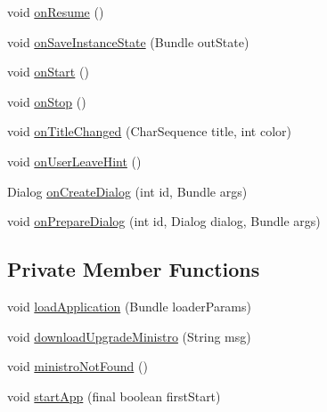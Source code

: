 \begin{DoxyCompactItemize}
\item 
void \hyperlink{classorg_1_1kde_1_1necessitas_1_1origo_1_1_qt_activity_ab896135952040c849fccf0aa795aa860}{on\-Resume} ()
\item 
void \hyperlink{classorg_1_1kde_1_1necessitas_1_1origo_1_1_qt_activity_a37b81ac0502a9d8c15e670a52948463e}{on\-Save\-Instance\-State} (Bundle out\-State)
\item 
void \hyperlink{classorg_1_1kde_1_1necessitas_1_1origo_1_1_qt_activity_aa10945ea75fbdd9568b8b8202057bbec}{on\-Start} ()
\item 
void \hyperlink{classorg_1_1kde_1_1necessitas_1_1origo_1_1_qt_activity_a7055e970211a8bf0637d48ca4632980a}{on\-Stop} ()
\item 
void \hyperlink{classorg_1_1kde_1_1necessitas_1_1origo_1_1_qt_activity_aa40948204cbea803a4e5c18365efc2b7}{on\-Title\-Changed} (Char\-Sequence title, int color)
\item 
void \hyperlink{classorg_1_1kde_1_1necessitas_1_1origo_1_1_qt_activity_a0cac0e48f2322ee42c1cdc195ec69598}{on\-User\-Leave\-Hint} ()
\item 
Dialog \hyperlink{classorg_1_1kde_1_1necessitas_1_1origo_1_1_qt_activity_a8ed2ef09ad8b93d417b9a9f0f6e3f5fb}{on\-Create\-Dialog} (int id, Bundle args)
\item 
void \hyperlink{classorg_1_1kde_1_1necessitas_1_1origo_1_1_qt_activity_aafaafd0dbcb59708982dc119082195ce}{on\-Prepare\-Dialog} (int id, Dialog dialog, Bundle args)
\end{DoxyCompactItemize}
\subsection*{Private Member Functions}
\begin{DoxyCompactItemize}
\item 
void \hyperlink{classorg_1_1kde_1_1necessitas_1_1origo_1_1_qt_activity_a6efdacbcdcd7cea2d7a3785d7300e9ab}{load\-Application} (Bundle loader\-Params)
\item 
void \hyperlink{classorg_1_1kde_1_1necessitas_1_1origo_1_1_qt_activity_a03bce0e522e5d949a99f65ccf30916bf}{download\-Upgrade\-Ministro} (String msg)
\item 
void \hyperlink{classorg_1_1kde_1_1necessitas_1_1origo_1_1_qt_activity_a7fe5f4438970743566e67e12335d472f}{ministro\-Not\-Found} ()
\item 
void \hyperlink{classorg_1_1kde_1_1necessitas_1_1origo_1_1_qt_activity_af3924b311d2966d6c7e48122899d3c35}{start\-App} (final boolean first\-Start)
\end{DoxyCompactItemize}
